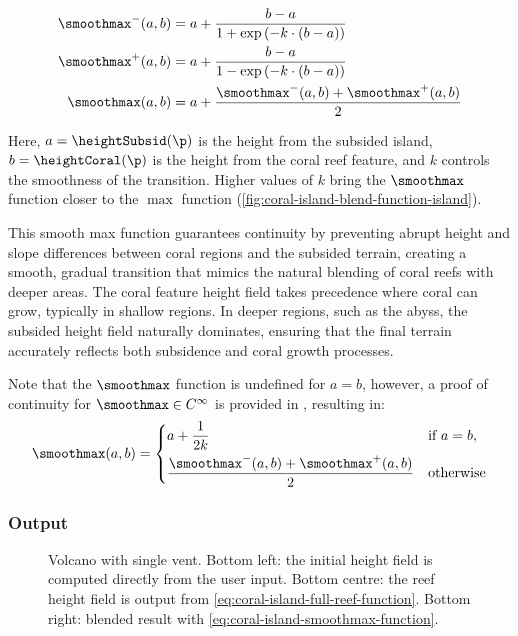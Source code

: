 \begin{align}
    \smoothmax^-(a, b) &= a + \frac{b - a}{1 + \exp\left(-k \cdot (b - a) \right)} \\
    \smoothmax^+(a, b) &= a + \frac{b - a}{1 - \exp\left(-k \cdot (b - a) \right)} \\
    \smoothmax(a, b) &= a + \frac{\smoothmax^-(a, b) + \smoothmax^+(a, b)}{2}
\end{align}

Here, $a = \heightSubsid(\p)$ is the height from the subsided island, $b = \heightCoral(\p)$ is the height from the coral reef feature, and $k$ controls the smoothness of the transition. Higher values of $k$ bring the $\smoothmax$ function closer to the $\max$ function (\cref{fig:coral-island-blend-function-island}).

This smooth max function guarantees continuity by preventing abrupt height and slope differences between coral regions and the subsided terrain, creating a smooth, gradual transition that mimics the natural blending of coral reefs with deeper areas. The coral feature height field takes precedence where coral can grow, typically in shallow regions. In deeper regions, such as the abyss, the subsided height field naturally dominates, ensuring that the final terrain accurately reflects both subsidence and coral growth processes.

Note that the $\smoothmax$ function is undefined for $a = b$, however, a proof of continuity for $\smoothmax \in C^\infty$ is provided in , resulting in:
\begin{align}
    \label{eq:coral-island-smoothmax-function}
    \smoothmax(a, b) = \begin{dcases}
        a + \frac{1}{2k} & \text{if } a = b, \\
        \frac{\smoothmax^-(a, b) + \smoothmax^+(a, b)}{2} & \text{otherwise}
    \end{dcases}
\end{align}

\subsubsection{Output}
\label{sec:coral-island-procedural-output}

\begin{figure}
    \caption{Volcano with single vent. Bottom left: the initial height field is computed directly from the user input. Bottom centre: the reef height field is output from \cref{eq:coral-island-full-reef-function}. Bottom right: blended result with \cref{eq:coral-island-smoothmax-function}.}
    \label{fig:coral-island-volcano-example}
\end{figure}

